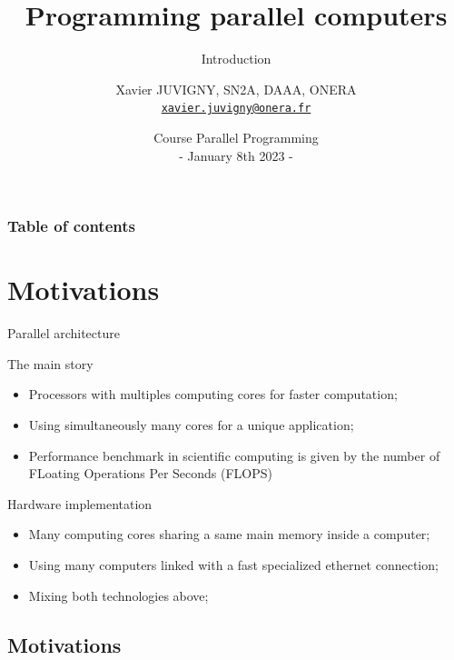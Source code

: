 \documentclass[compress,10pt,aspectratio=169]{beamer}
\title[Parallel programming\hspace{2em}]{Programming parallel computers}
\subtitle{Introduction}
\author[X. JUVIGNY]{Xavier JUVIGNY, SN2A, DAAA, ONERA\\ \href{mailto:xavier.juvigny@onera.fr}{\texttt{xavier.juvigny@onera.fr}} }
\date[01/08/2023]{Course Parallel Programming\\- January 8th 2023 -}
\institute{\inst{1}ONERA,\inst{2}DAAA}
\begin{document}
\MakeTitlePage

\begin{frame}
\frametitle{Table of contents}
\begin{multicols}{2}
\tableofcontents[hideallsubsections]
\end{multicols}
\end{frame}

\section{Motivations}

\begin{frame}[fragile]{Parallel architecture}
    \small
    \begin{block}{The main story}
        \begin{itemize}
            \item Processors with multiples computing cores for faster computation;
            \item Using simultaneously many cores for a unique application;
            \item Performance benchmark in scientific computing is given by the number of FLoating Operations Per Seconds (FLOPS)
        \end{itemize}
    \end{block}

    \begin{exampleblock}{Hardware implementation}
        \begin{itemize}
            \item Many computing cores sharing a same main memory inside a computer;
            \item Using many computers linked with a fast specialized ethernet connection;
            \item Mixing both technologies above;
        \end{itemize}
    \end{exampleblock}
\end{frame}

\subsection{Motivations}
\end{document}
